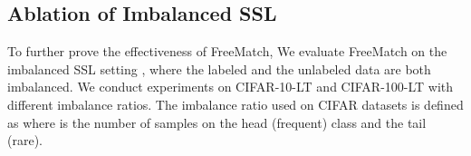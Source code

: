 \documentclass{article} \usepackage{iclr2023_conference,times}
\theoremstyle{plain}
\theoremstyle{definition}
\theoremstyle{remark}
\newcommand{\ourmethod}{FreeMatch\xspace}
\begin{document}
\subsection{Ablation of Imbalanced SSL}
\label{sec:ablation-imbssl}
\begin{table}[]
    \centering
    \caption{
    Error rates (\%) of imbalanced SSL using 3 different random seeds. }
    \label{tab:lt_result}
    \end{table}
To further prove the effectiveness of \ourmethod, We evaluate \ourmethod on the imbalanced SSL setting \cite{kim2020distribution,wei2021crest,lee2021abc,fan2021cossl}, where the labeled and the unlabeled data are both imbalanced. We conduct experiments on
CIFAR-10-LT and CIFAR-100-LT with different imbalance ratios. The imbalance ratio used on CIFAR datasets is defined as  where  is the number of samples on the head (frequent) class and  the tail (rare).
\end{document}
